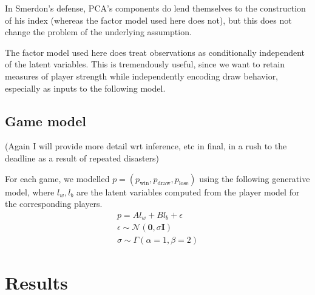 \documentclass{article}
\begin{document}
In Smerdon's defense, PCA's components do lend themselves to the construction of his index (whereas the factor model used here does not), but this does not change the problem of the underlying assumption.

The factor model used here does treat observations as conditionally independent of the latent variables.
This is tremendously useful, since we want to retain measures of player strength while independently encoding
draw behavior, especially as inputs to the following model.

\subsection{Game model}
(Again I will provide more detail wrt inference, etc in final, in a rush to the deadline as a result of repeated disasters)

For each game, we modelled $p=(p_{\text{win}}, p_{\text{draw}}, p_{\text{lose}})$
using the following generative model, where $l_w, l_b$ are the latent variables
 computed from the player model for the corresponding players.
\begin{align*}
    p = A l_w + B l_b + \epsilon \\
    \epsilon \sim \mathcal{N}(\mathbf{0}, \sigma\mathbf{I}) \\
    \sigma\sim \Gamma(\alpha=1,\beta=2)
\end{align*}


\section{Results}
\end{document}
